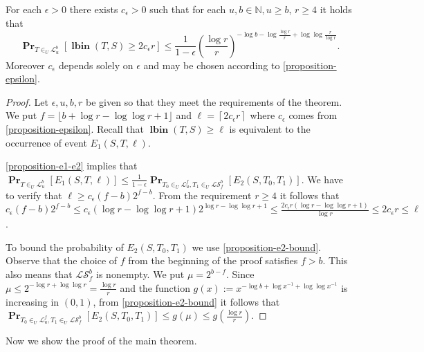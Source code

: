 \documentclass[unicode,review]{siamart1116}
\newcommand{\lbin}[2]{\operatorname{\mathbf{lbin}}({#1}, {#2})}
\newcommand{\linearmaps}[2]{\mathcal{L}_{#1}^{#2}}
\newcommand{\surjectivelinearmaps}[2]{\mathcal{LS}_{#1}^{#2}}
\newcommand{\probs}[2]{\operatorname{\mathbf{Pr}}_{{#1}}\left[{#2}\right]}
\numberwithin{theorem}{section}
\begin{document}
\begin{theorem}
\label{theorem-prob-distribution-bound}
For each $\epsilon > 0$ there exists $c_\epsilon > 0$ such that for each $u, b \in \mathbb{N}, u \geq b$, $r \geq 	 4$ it holds that
\[
\probs{T \in_U \linearmaps{u}{b}}{\lbin{T}{S} \geq 2 c_\epsilon r} \leq \frac{1}{1 - \epsilon}\left(\frac{\log r}{r}\right)^{-\log b - \log \frac{\log r}{r} + \log \log \frac{r}{\log r}}.
\]
Moreover $c_\epsilon$ depends solely on $\epsilon$ and may be chosen according to \cref{proposition-epsilon}.
\end{theorem}
\begin{proof}
Let $\epsilon, u, b, r$ be given so that they meet the requirements of the theorem.
We put $f = \lfloor b + \log r - \log \log r + 1 \rfloor$ and $\ell = \left \lceil 2c_\epsilon r \right\rceil$ where $c_\epsilon$ comes from \cref{proposition-epsilon}.
Recall that $\lbin{T}{S} \geq \ell$ is equivalent to the occurrence of event $E_1(S, T, \ell)$.

\cref{proposition-e1-e2} implies that $\probs{T \in_U \linearmaps{u}{b}}{E_1(S, T, \ell)} \leq \frac{1}{1 - \epsilon}\probs{T_0 \in_U \linearmaps{u}{f}, T_1 \in_U \surjectivelinearmaps{f}{b}}{E_2(S, T_0, T_1)}$.
We have to verify that $\ell \geq c_\epsilon (f - b)2^{f - b}$.
From the requirement $r \geq 4$ it follows that $c_\epsilon(f - b)2^{f - b} \leq c_\epsilon(\log r - \log \log r + 1)2^{\log r - \log \log r + 1} \leq \frac{2c_\epsilon r(\log r - \log \log r + 1)}{\log r} \leq 2c_\epsilon r \leq \ell$.

To bound the probability of $E_2(S, T_0, T_1)$ we use \cref{proposition-e2-bound}.
Observe that the choice of $f$ from the beginning of the proof satisfies $f > b$.
This also means that $\surjectivelinearmaps{f}{b}$ is nonempty. 
We put $\mu = 2^{b - f}$.
Since $\mu \leq 2^{-\log r + \log \log r} = \frac{\log r}{r}$ and the function $g(x) := x ^ {- \log b + \log x^{-1} + \log \log x^{-1}}$ is increasing in $(0, 1)$, from \cref{proposition-e2-bound} it follows that $\probs{T_0 \in_U \linearmaps{u}{f}, T_1 \in_U \surjectivelinearmaps{f}{b}}{E_2(S, T_0, T_1)} \leq g(\mu) \leq g\left(\frac{\log r}{r}\right)$.
\end{proof}

Now we show the proof of the main theorem.
\end{document}
